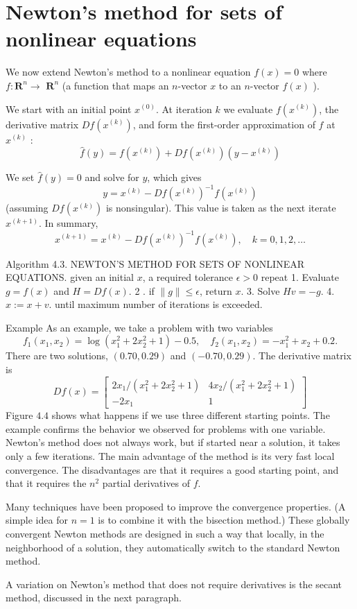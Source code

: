 \section{Newton’s method for sets of nonlinear equations}

We now extend Newton's method to a nonlinear equation $ f(x)=0 $ where $ f: \mathbf{R}^{n} \rightarrow $ $ \mathbf{R}^{n} $ (a function that maps an $ n $-vector $ x $ to an $ n $-vector $ f(x) $ ).

We start with an initial point $ x^{(0)} $. At iteration $ k $ we evaluate $ f\left(x^{(k)}\right) $, the derivative matrix $ D f\left(x^{(k)}\right) $, and form the first-order approximation of $ f $ at $ x^{(k)} $ :
$$
\hat{f}(y)=f\left(x^{(k)}\right)+D f\left(x^{(k)}\right)\left(y-x^{(k)}\right)
$$

We set $ \hat{f}(y)=0 $ and solve for $ y $, which gives
$$
y=x^{(k)}-D f\left(x^{(k)}\right)^{-1} f\left(x^{(k)}\right)
$$
(assuming $ D f\left(x^{(k)}\right) $ is nonsingular). This value is taken as the next iterate $ x^{(k+1)} $. In summary,
$$
x^{(k+1)}=x^{(k)}-D f\left(x^{(k)}\right)^{-1} f\left(x^{(k)}\right), \quad k=0,1,2, \ldots
$$

\begin{algorithm}
    Algorithm 4.3. NEWTON'S METHOD FOR SETS OF NONLINEAR EQUATIONS.
given an initial $ x $, a required tolerance $ \epsilon>0 $
repeat
1. Evaluate $ g=f(x) $ and $ H=D f(x) $.
2 . if $ \|g\| \leq \epsilon $, return $ x $.
3. Solve $ H v=-g $.
4. $ x:=x+v $.
until maximum number of iterations is exceeded.
\end{algorithm}

\begin{example}
    Example As an example, we take a problem with two variables
$$
f_{1}\left(x_{1}, x_{2}\right)=\log \left(x_{1}^{2}+2 x_{2}^{2}+1\right)-0.5, \quad f_{2}\left(x_{1}, x_{2}\right)=-x_{1}^{2}+x_{2}+0.2 .
$$
There are two solutions, $ (0.70,0.29) $ and $ (-0.70,0.29) $. The derivative matrix is
$$
D f(x)=\left[\begin{array}{cc}
2 x_{1} /\left(x_{1}^{2}+2 x_{2}^{2}+1\right) & 4 x_{2} /\left(x_{1}^{2}+2 x_{2}^{2}+1\right) \\
-2 x_{1} & 1
\end{array}\right]
$$
Figure $ 4.4 $ shows what happens if we use three different starting points.
The example confirms the behavior we observed for problems with one variable. Newton's method does not always work, but if started near a solution, it takes only a few iterations. The main advantage of the method is its very fast local convergence. The disadvantages are that it requires a good starting point, and that it requires the $ n^{2} $ partial derivatives of $ f $.

Many techniques have been proposed to improve the convergence properties. (A simple idea for $ n=1 $ is to combine it with the bisection method.) These globally convergent Newton methods are designed in such a way that locally, in the neighborhood of a solution, they automatically switch to the standard Newton method.

A variation on Newton's method that does not require derivatives is the secant method, discussed in the next paragraph.
\end{example}

